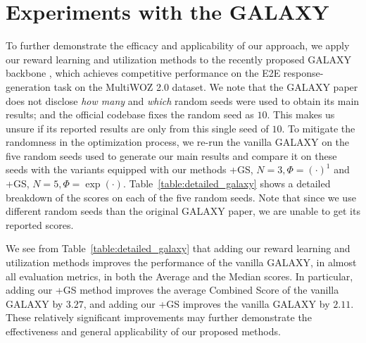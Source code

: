 \section{Experiments with the GALAXY} \label{sec:exp_galaxy}

To further demonstrate the efficacy and applicability of our approach, we apply our reward learning and utilization methods to the recently proposed GALAXY backbone \citep{he2022galaxy}, which achieves competitive performance on the E2E response-generation task on the MultiWOZ 2.0 dataset.
We note that the GALAXY paper does not disclose \emph{how many} and \emph{which} random seeds were used to obtain its main results; and the official codebase fixes the random seed as $10$.
This makes us unsure if its reported results are only from this single seed of $10$.
To mitigate the randomness in the optimization process, we re-run the vanilla GALAXY on the five random seeds used to generate our main results and compare it on these seeds with the variants equipped with our methods \rewardnet+GS, $N=3, \Phi=(\cdot)^1$ and \rewardmle+GS, $N=5, \Phi=\exp(\cdot)$.
Table~\ref{table:detailed_galaxy} shows a detailed breakdown of the scores on each of the five random seeds.
Note that since we use different random seeds than the original GALAXY paper, we are unable to get its reported scores.

We see from Table~\ref{table:detailed_galaxy} that adding our reward learning and utilization methods improves the performance of the vanilla GALAXY, in almost all evaluation metrics, in both the Average and the Median scores.
In particular, adding our \rewardmle+GS method improves the average Combined Score of the vanilla GALAXY by $3.27$, and adding our \rewardnet +GS improves the vanilla GALAXY by $2.11$.
These relatively significant improvements may further demonstrate the effectiveness and general applicability of our proposed methods.


